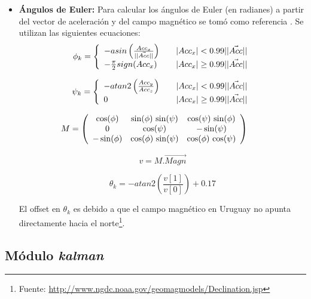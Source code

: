 \documentclass[main]{subfiles}
\begin{document}
\begin{itemize}
\item \textbf{\'Angulos de Euler:} Para calcular los \'angulos de Euler (en radianes) a partir del vector de aceleraci\'on y del campo magn\'etico se tom\'o como referencia \cite{bib:euler_magneto_acc}. Se utilizan las siguientes ecuaciones:
  \[
  \phi_k = \left\{
    \begin{array}{l l}
      -asin\left(\frac{Acc_x}{\vert\vert\vec{Acc}\vert\vert}\right) & \quad \vert Acc_x \vert < 0.99 \vert\vert \vec{Acc} \vert\vert \\
      -\frac{\pi}{2} sign(Acc_x) & \quad   \vert Acc_x \vert \geq 0.99 \vert\vert \vec{Acc} \vert\vert \\
    \end{array} \right.
  \]

  \[
  \psi_k = \left\{
    \begin{array}{l l}
      -atan2\left(\frac{Acc_y}{Acc_z}\right) & \quad \vert Acc_x \vert < 0.99 \vert\vert \vec{Acc} \vert\vert \\
      0 & \quad   \vert Acc_x \vert \geq 0.99 \vert\vert \vec{Acc} \vert\vert \\
    \end{array} \right.
  \]
      
  \[
  \hspace{-20pt}
  M = 
\left(\begin{array}{ccc} \cos\!\left(\mathrm{\phi}\right) & \sin\!\left(\mathrm{\phi}\right)\, \sin\!\left(\mathrm{\psi}\right) & \cos\!\left(\mathrm{\psi}\right)\, \sin\!\left(\mathrm{\phi}\right)\\ 0 & \cos\!\left(\mathrm{\psi}\right) & - \sin\!\left(\mathrm{\psi}\right)\\ - \sin\!\left(\mathrm{\phi}\right) & \cos\!\left(\mathrm{\phi}\right)\, \sin\!\left(\mathrm{\psi}\right) & \cos\!\left(\mathrm{\phi}\right)\, \cos\!\left(\mathrm{\psi}\right) \end{array}\right)
  \]

  \[
  v = M . \vec{Magn}
  \]

  \[
  \theta_k = -atan2\left( \frac{v[1]}{v[0]}\right) + 0.17
  \]

El offset en $\theta_k$ es debido a que el campo magn\'etico en Uruguay no apunta directamente hacia el norte\footnote{Fuente: \url{http://www.ngdc.noaa.gov/geomagmodels/Declination.jsp}}.

\end{itemize}

\subsection{M\'odulo \textit{kalman}}
\label{sec:software:kalman}
\end{document}
